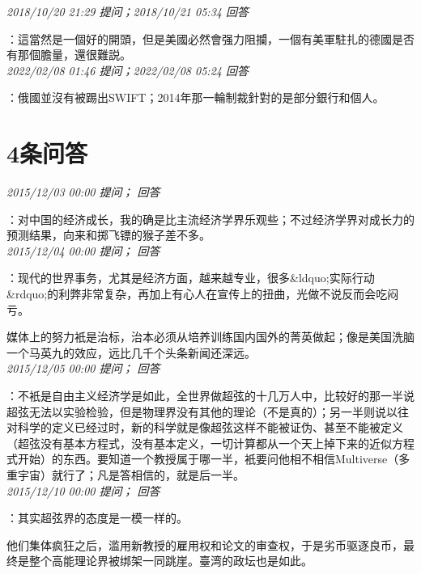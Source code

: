\documentclass[twocolumn]{ctexart}
\begin{document}
\textit{\hfill\noindent\small 2018/10/20 21:29 提问；2018/10/21 05:34 回答}

：這當然是一個好的開頭，但是美國必然會强力阻攔，一個有美軍駐扎的德國是否有那個膽量，還很難説。
\\

\textit{\hfill\noindent\small 2022/02/08 01:46 提问；2022/02/08 05:24 回答}

：俄國並沒有被踢出SWIFT；2014年那一輪制裁針對的是部分銀行和個人。
\\

\section{4条问答}

\textit{\hfill\noindent\small 2015/12/03 00:00 提问； 回答}

：对中国的经济成长，我的确是比主流经济学界乐观些；不过经济学界对成长力的预测结果，向来和掷飞镖的猴子差不多。\\

\textit{\hfill\noindent\small 2015/12/04 00:00 提问； 回答}

：现代的世界事务，尤其是经济方面，越来越专业，很多\&ldquo;实际行动\&rdquo;的利弊非常复杂，再加上有心人在宣传上的扭曲，光做不说反而会吃闷亏。

媒体上的努力衹是治标，治本必须从培养训练国内国外的菁英做起；像是美国洗脑一个马英九的效应，远比几千个头条新闻还深远。\\

\textit{\hfill\noindent\small 2015/12/05 00:00 提问； 回答}

：不衹是自由主义经济学是如此，全世界做超弦的十几万人中，比较好的那一半说超弦无法以实验检验，但是物理界没有其他的理论（不是真的）；另一半则说以往对科学的定义已经过时，新的科学就是像超弦这样不能被证伪、甚至不能被定义（超弦没有基本方程式，没有基本定义，一切计算都从一个天上掉下来的近似方程式开始）的东西。要知道一个教授属于哪一半，衹要问他相不相信Multiverse（多重宇宙）就行了；凡是答相信的，就是后一半。\\

\textit{\hfill\noindent\small 2015/12/10 00:00 提问； 回答}

：其实超弦界的态度是一模一样的。

他们集体疯狂之后，滥用新教授的雇用权和论文的审查权，于是劣币驱逐良币，最终是整个高能理论界被绑架一同跳崖。臺湾的政坛也是如此。\\
\end{document}
